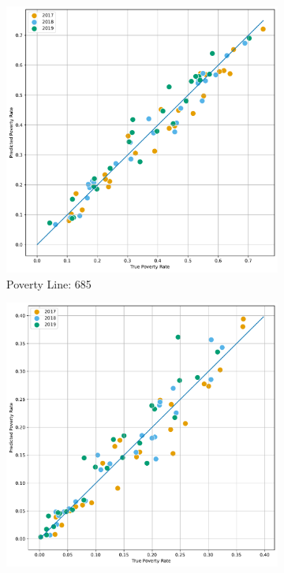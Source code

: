 \begin{figure}[H]
\caption{Correlation: Predicted Poverty against true by Region (WB Version)}
\centering
        \centering
        \begin{subfigure}[b]{0.47\textwidth}
            \centering
            \includegraphics[width=\textwidth]{../figures/fig4_2_prediction_wb_vs_true_poverty_rate_regions_p685_scatter.pdf}
            \caption{Poverty Line: 685}
        \end{subfigure}
        \hfill
        \begin{subfigure}[b]{0.47\textwidth}
            \centering
            \includegraphics[width=\textwidth]{../figures/fig4_2_prediction_wb_vs_true_poverty_rate_regions_p365_scatter.pdf}

\end{subfigure}
\end{figure}
